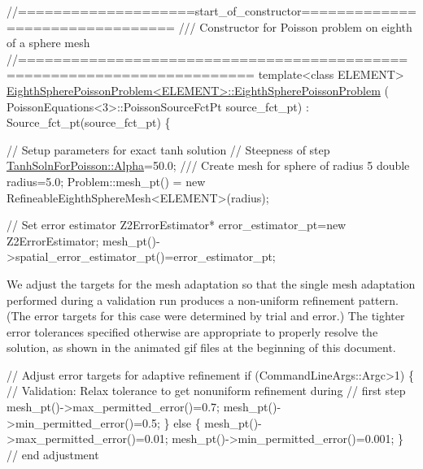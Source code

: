 \begin{DoxyCodeInclude}
\textcolor{comment}{//====================start\_of\_constructor================================}
\textcolor{comment}{/// Constructor for Poisson problem on eighth of a sphere mesh}
\textcolor{comment}{}\textcolor{comment}{//========================================================================}
\textcolor{keyword}{template}<\textcolor{keyword}{class} ELEMENT>
\hyperlink{classEighthSpherePoissonProblem_ae51db2c3e80f0d5628e4d81eb1c11db4}{EighthSpherePoissonProblem<ELEMENT>::EighthSpherePoissonProblem}
      (
   PoissonEquations<3>::PoissonSourceFctPt source\_fct\_pt) : 
         Source\_fct\_pt(source\_fct\_pt)
\{ 

 \textcolor{comment}{// Setup parameters for exact tanh solution}
 \textcolor{comment}{// Steepness of step}
 \hyperlink{namespaceTanhSolnForPoisson_ae676ccd186d5df119cce811596d949c1}{TanhSolnForPoisson::Alpha}=50.0;
\textcolor{comment}{}
\textcolor{comment}{ /// Create mesh for sphere of radius 5}
\textcolor{comment}{} \textcolor{keywordtype}{double} radius=5.0; 
 Problem::mesh\_pt() = \textcolor{keyword}{new} RefineableEighthSphereMesh<ELEMENT>(radius);

 \textcolor{comment}{// Set error estimator }
 Z2ErrorEstimator* error\_estimator\_pt=\textcolor{keyword}{new} Z2ErrorEstimator;
 mesh\_pt()->spatial\_error\_estimator\_pt()=error\_estimator\_pt;

\end{DoxyCodeInclude}


We adjust the targets for the mesh adaptation so that the single mesh adaptation performed during a validation run produces a non-\/uniform refinement pattern. (The error targets for this case were determined by trial and error.) The tighter error tolerances specified otherwise are appropriate to properly resolve the solution, as shown in the animated gif files at the beginning of this document. 
\begin{DoxyCodeInclude}
 \textcolor{comment}{// Adjust error targets for adaptive refinement}
 \textcolor{keywordflow}{if} (CommandLineArgs::Argc>1)
  \{
   \textcolor{comment}{// Validation: Relax tolerance to get nonuniform refinement during}
   \textcolor{comment}{// first step}
   mesh\_pt()->max\_permitted\_error()=0.7;
   mesh\_pt()->min\_permitted\_error()=0.5;
  \}
 \textcolor{keywordflow}{else}
  \{
   mesh\_pt()->max\_permitted\_error()=0.01;
   mesh\_pt()->min\_permitted\_error()=0.001;
  \} \textcolor{comment}{// end adjustment}

\end{DoxyCodeInclude}


